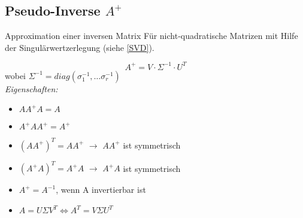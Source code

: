 \subsection{Pseudo-Inverse \(A^+\)}

Approximation einer inversen Matrix Für nicht-quadratische Matrizen mit Hilfe der Singulärwertzerlegung (siehe \ref{SVD}).

\begin{equation*}
    A^+ = V \cdot \Sigma^{-1} \cdot U^T
\end{equation*}
wobei \(\Sigma^{-1}=diag(\sigma_1^{-1}, \hdots \sigma_r^{-1})\)\\

\textit{Eigenschaften:}
\begin{itemize}
    \item \(A  A^+  A = A\)
    \item \(A^+  A  A^+ = A^+\)
    \item \((A  A^+)^T = A  A^+\) \(\rightarrow\) \(A  A^+\) ist symmetrisch
    \item \((A^+  A)^T = A^+  A\) \(\rightarrow\) \(A^+  A\) ist symmetrisch
    \item \(A^+ = A^{-1}\), wenn A invertierbar ist
    \item \(A = U \Sigma V^T \Leftrightarrow A^T = V \Sigma U^T \)
\end{itemize}